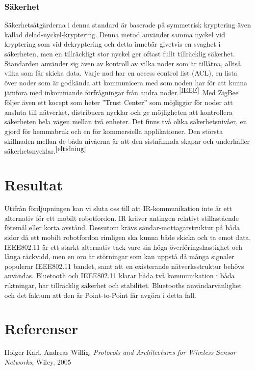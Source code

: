 \documentclass[a4paper,12pt,fleqn]{article}
\begin{document}
\subsubsection{Säkerhet}
Säkerhetsåtgärderna i denna standard är baserade på symmetrisk kryptering även kallad delad-nyckel-kryptering. Denna metod använder samma nyckel vid kryptering som vid dekryptering och detta innebär givetvis en svaghet i säkerheten, men en tillräckligt stor nyckel ger oftast fullt tillräcklig säkerhet. 
Standarden använder sig även av kontroll av vilka noder som är tillåtna, alltså vilka som får skicka data. Varje nod har en access control list (ACL), en lista över noder som är godkända att kommunicera med som noden har för att kunna jämföra med inkommande förfrågningar från andra noder.$^{\ref{IEEE}}$ 
Med ZigBee följer även ett kocept som heter ''Trust Center'' som möjliggör för noder att ansluta till nätverket, distribuera nycklar och ge möjligheten att kontrollera säkerheten hela vägen mellan två enheter. Det finns två olika säkerhetsnivåer, en gjord för hemmabruk och en för kommersiella applikationer. Den största skillnaden mellan de båda nivåerna är att den sistnämnda skapar och underhåller säkerhetsnycklar.$^{\ref{eltidning}}$ 

\section{Resultat}
Utifrån fördjupningen kan vi sluta oss till att IR-kommunikation inte är ett alternativ för ett mobilt robotfordon. IR kräver antingen relativt stillastående föremål eller korta avstånd. Dessutom krävs sändar-mottagarstruktur på båda sidor då ett mobilt robotfordon rimligen ska kunna både skicka och ta emot data. 
IEEE802.11 är ett starkt alternativ tack vare sin höga överföringshastighet och långa räckvidd, men en oro är störningar som kan uppstå då många signaler populerar IEEE802.11 bandet, samt att en existerande nätverksstruktur behövs användas.
Bluetooth och IEEE802.11 klarar båda två kommunikation i båda riktningar, har tillräcklig säkerhet och stabilitet. Bluetooths användarvänlighet och det faktum att den är Point-to-Point får avgöra i detta fall.

\newpage 
\section*{Referenser}

Holger Karl, Andreas Willig. \emph{Protocols and Architectures for Wireless Sensor Networks}, Wiley, 2005
\end{document}
